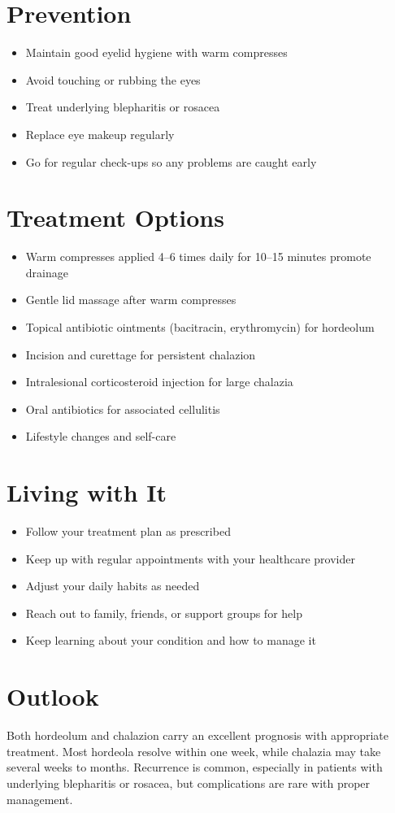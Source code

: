 \section{Prevention}

\begin{itemize}[noitemsep]
  \item Maintain good eyelid hygiene with warm compresses
  \item Avoid touching or rubbing the eyes
  \item Treat underlying blepharitis or rosacea
  \item Replace eye makeup regularly
  \item Go for regular check-ups so any problems are caught early
\end{itemize}

\section{Treatment Options}

\begin{itemize}[noitemsep]
  \item Warm compresses applied 4--6 times daily for 10--15 minutes promote drainage
  \item Gentle lid massage after warm compresses
  \item Topical antibiotic ointments (bacitracin, erythromycin) for hordeolum
  \item Incision and curettage for persistent chalazion
  \item Intralesional corticosteroid injection for large chalazia
  \item Oral antibiotics for associated cellulitis
  \item Lifestyle changes and self-care
\end{itemize}

\section{Living with It}

\begin{itemize}[noitemsep]
  \item Follow your treatment plan as prescribed
  \item Keep up with regular appointments with your healthcare provider
  \item Adjust your daily habits as needed
  \item Reach out to family, friends, or support groups for help
  \item Keep learning about your condition and how to manage it
\end{itemize}

\section{Outlook}
Both hordeolum and chalazion carry an excellent prognosis with appropriate treatment. Most hordeola resolve within one week, while chalazia may take several weeks to months. Recurrence is common, especially in patients with underlying blepharitis or rosacea, but complications are rare with proper management.
